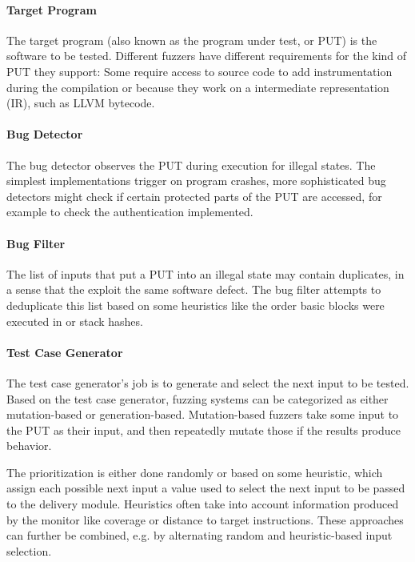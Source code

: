 \documentclass{article}
\begin{document}
\begin{multicols}{2}
  \paragraph{Target Program}
  The target program (also known as the program under test, or PUT) is the software to be tested. Different fuzzers have different requirements for the kind of PUT they support: Some require access to source code to add instrumentation during the compilation or because they work on a intermediate representation (IR), such as LLVM bytecode.

  \paragraph{Bug Detector}
  The bug detector observes the PUT during execution for illegal states. The simplest implementations trigger on program crashes, more sophisticated bug detectors might check if certain protected parts of the PUT are accessed, for example to check the authentication implemented.

  \paragraph{Bug Filter}
  The list of inputs that put a PUT into an illegal state may contain duplicates, in a sense that the exploit the same software defect. The bug filter attempts to deduplicate this list based on some heuristics like the order basic blocks were executed in or stack hashes.

  \paragraph{Test Case Generator}
  The test case generator's job is to generate and select the next input to be tested. Based on the test case generator, fuzzing systems can be categorized as either mutation-based or generation-based. Mutation-based fuzzers take some input to the PUT as their input, and then repeatedly mutate those if the results produce  behavior\cite{EvaluatingFuzzTesting}.

  The prioritization is either done randomly or based on some heuristic, which assign each possible next input a value used to select the next input to be passed to the delivery module. Heuristics often take into account information produced by the monitor like coverage or distance to target instructions. These approaches can further be combined, e.g. by alternating random and heuristic-based input selection.


\end{multicols}
\end{document}
